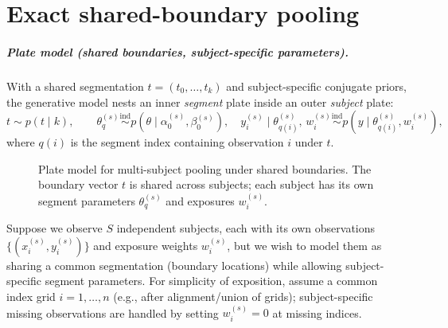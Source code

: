 \chapter{Exact shared-boundary pooling}
\label{ch:shared}

\label{sec:replicates}

\paragraph{Plate model (shared boundaries, subject-specific parameters).}
With a shared segmentation $t=(t_0,\dots,t_k)$ and subject-specific conjugate priors,
the generative model nests an inner \emph{segment} plate inside an outer \emph{subject} plate:
\begin{equation}
t\sim p(t\mid k),\qquad
\theta^{(s)}_q \stackrel{\mathrm{ind}}{\sim} p(\theta\mid \alpha^{(s)}_0,\beta^{(s)}_0),\quad
y^{(s)}_i\mid \theta^{(s)}_{q(i)},\,w^{(s)}_i \stackrel{\mathrm{ind}}{\sim} p(y\mid \theta^{(s)}_{q(i)},w^{(s)}_i),
\label{eq:plate-replicates}
\end{equation}
where $q(i)$ is the segment index containing observation $i$ under $t$.
\begin{figure}[H]
\centering
{}
\caption[Shared-boundary multi-subject plate model]{Plate model for multi-subject pooling under shared boundaries. The boundary vector $t$ is shared across subjects; each subject has its own segment parameters $\theta^{(s)}_q$ and exposures $w^{(s)}_i$.}
\label{fig:plate-replicates}
\end{figure}

Suppose we observe $S$ independent subjects, each with its own observations
$\{(x^{(s)}_i,y^{(s)}_i)\}$ and exposure weights $w^{(s)}_i$, but we wish to model them as
sharing a common segmentation (boundary locations) while allowing subject-specific segment
parameters. For simplicity of exposition, assume a common index grid $i=1,\dots,n$ (e.g., after
alignment/union of grids); subject-specific missing observations are handled by setting $w^{(s)}_i=0$
at missing indices.

